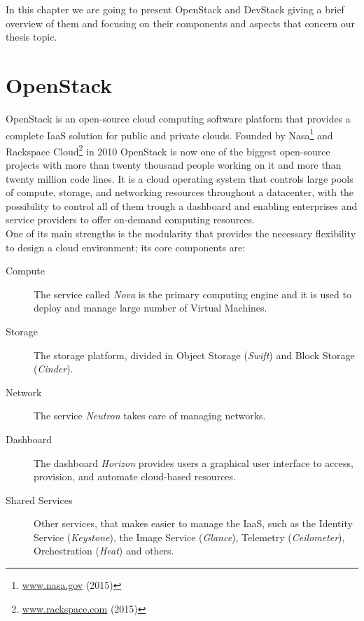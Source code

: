 

In this chapter we are going to present OpenStack and DevStack giving a brief overview of them and focusing on their components and aspects that concern our thesis topic.

\section{OpenStack}
\label{sec:openstack}
OpenStack is an open-source cloud computing software platform that provides a complete IaaS solution for public and private clouds. Founded by Nasa\footnote{\url{www.nasa.gov} (2015)} and Rackspace Cloud\footnote{\url{www.rackspace.com} (2015)} in 2010 OpenStack is now one of the biggest open-source projects with more than twenty thousand people working on it and more than twenty million code lines. It is a cloud operating system that controls large pools of compute, storage, and networking resources throughout a datacenter, with the possibility to control all of them trough a dashboard and enabling enterprises and service providers to offer on-demand computing resources.\\
One of its main strengths is the modularity that provides the necessary flexibility to design a cloud environment; its core components are:
\begin{description}
	\item[Compute] The service called \textit{Nova} is the primary computing engine and it is used to deploy and manage large number of Virtual Machines.
	\item[Storage] The storage platform, divided in Object Storage (\textit{Swift}) and Block Storage (\textit{Cinder}).
	\item[Network] The service \textit{Neutron} takes care of managing networks. 
	\item[Dashboard] The dashboard \textit{Horizon} provides users  a graphical user interface to access, provision, and automate cloud-based resources.
	\item[Shared Services] Other services, that makes easier to manage the IaaS, such as the Identity Service (\textit{Keystone}), the Image Service (\textit{Glance}), Telemetry (\textit{Ceilometer}), Orchestration (\textit{Heat}) and others.
\end{description}

